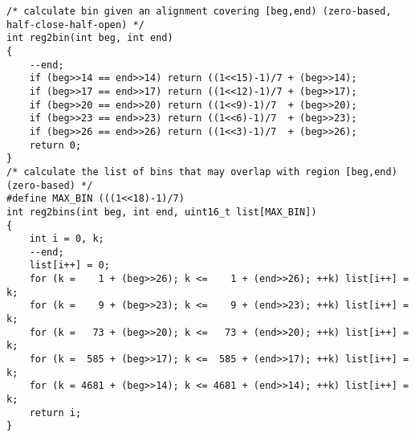 \documentclass[10pt]{article}
\begin{document}
{\small
\begin{verbatim}
/* calculate bin given an alignment covering [beg,end) (zero-based, half-close-half-open) */
int reg2bin(int beg, int end)
{
    --end;
    if (beg>>14 == end>>14) return ((1<<15)-1)/7 + (beg>>14);
    if (beg>>17 == end>>17) return ((1<<12)-1)/7 + (beg>>17);
    if (beg>>20 == end>>20) return ((1<<9)-1)/7  + (beg>>20);
    if (beg>>23 == end>>23) return ((1<<6)-1)/7  + (beg>>23);
    if (beg>>26 == end>>26) return ((1<<3)-1)/7  + (beg>>26);
    return 0;
}
/* calculate the list of bins that may overlap with region [beg,end) (zero-based) */
#define MAX_BIN (((1<<18)-1)/7)
int reg2bins(int beg, int end, uint16_t list[MAX_BIN])
{
    int i = 0, k;
    --end;
    list[i++] = 0;
    for (k =    1 + (beg>>26); k <=    1 + (end>>26); ++k) list[i++] = k;
    for (k =    9 + (beg>>23); k <=    9 + (end>>23); ++k) list[i++] = k;
    for (k =   73 + (beg>>20); k <=   73 + (end>>20); ++k) list[i++] = k;
    for (k =  585 + (beg>>17); k <=  585 + (end>>17); ++k) list[i++] = k;
    for (k = 4681 + (beg>>14); k <= 4681 + (end>>14); ++k) list[i++] = k;
    return i;
}
\end{verbatim}
}
\end{document}
